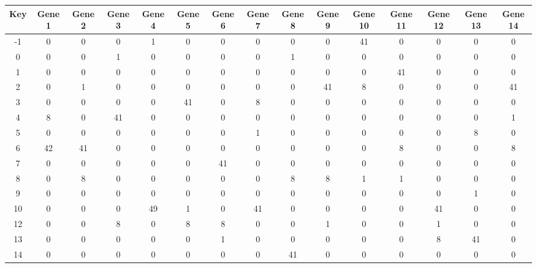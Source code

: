 \begin{tabular}{|c|c|c|c|c|c|c|c|c|c|c|c|c|c|c|}
\hline
Key & Gene 1 & Gene 2 & Gene 3 & Gene 4 & Gene 5 & Gene 6 & Gene 7 & Gene 8 & Gene 9 & Gene 10 & Gene 11 & Gene 12 & Gene 13 & Gene 14 \\
\hline
-1 & 0 & 0 & 0 & 1 & 0 & 0 & 0 & 0 & 0 & 41 & 0 & 0 & 0 & 0 \\
0 & 0 & 0 & 1 & 0 & 0 & 0 & 0 & 1 & 0 & 0 & 0 & 0 & 0 & 0 \\
1 & 0 & 0 & 0 & 0 & 0 & 0 & 0 & 0 & 0 & 0 & 41 & 0 & 0 & 0 \\
2 & 0 & 1 & 0 & 0 & 0 & 0 & 0 & 0 & 41 & 8 & 0 & 0 & 0 & 41 \\
3 & 0 & 0 & 0 & 0 & 41 & 0 & 8 & 0 & 0 & 0 & 0 & 0 & 0 & 0 \\
4 & 8 & 0 & 41 & 0 & 0 & 0 & 0 & 0 & 0 & 0 & 0 & 0 & 0 & 1 \\
5 & 0 & 0 & 0 & 0 & 0 & 0 & 1 & 0 & 0 & 0 & 0 & 0 & 8 & 0 \\
6 & 42 & 41 & 0 & 0 & 0 & 0 & 0 & 0 & 0 & 0 & 8 & 0 & 0 & 8 \\
7 & 0 & 0 & 0 & 0 & 0 & 41 & 0 & 0 & 0 & 0 & 0 & 0 & 0 & 0 \\
8 & 0 & 8 & 0 & 0 & 0 & 0 & 0 & 8 & 8 & 1 & 1 & 0 & 0 & 0 \\
9 & 0 & 0 & 0 & 0 & 0 & 0 & 0 & 0 & 0 & 0 & 0 & 0 & 1 & 0 \\
10 & 0 & 0 & 0 & 49 & 1 & 0 & 41 & 0 & 0 & 0 & 0 & 41 & 0 & 0 \\
12 & 0 & 0 & 8 & 0 & 8 & 8 & 0 & 0 & 1 & 0 & 0 & 1 & 0 & 0 \\
13 & 0 & 0 & 0 & 0 & 0 & 1 & 0 & 0 & 0 & 0 & 0 & 8 & 41 & 0 \\
14 & 0 & 0 & 0 & 0 & 0 & 0 & 0 & 41 & 0 & 0 & 0 & 0 & 0 & 0 \\
\hline
\end{tabular}